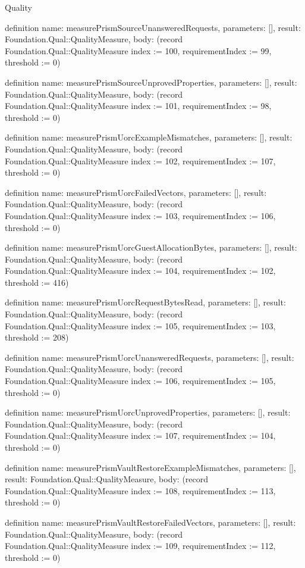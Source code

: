 \begin{lexlean}{Quality}
\begin{semanticmodule}
definition{
  name: measurePrismSourceUnansweredRequests,
  parameters: [],
  result: Foundation.Qual::QualityMeasure,
  body: (record Foundation.Qual::QualityMeasure {index := 100, requirementIndex := 99, threshold := 0})
}

definition{
  name: measurePrismSourceUnprovedProperties,
  parameters: [],
  result: Foundation.Qual::QualityMeasure,
  body: (record Foundation.Qual::QualityMeasure {index := 101, requirementIndex := 98, threshold := 0})
}

definition{
  name: measurePrismUorcExampleMismatches,
  parameters: [],
  result: Foundation.Qual::QualityMeasure,
  body: (record Foundation.Qual::QualityMeasure {index := 102, requirementIndex := 107, threshold := 0})
}

definition{
  name: measurePrismUorcFailedVectors,
  parameters: [],
  result: Foundation.Qual::QualityMeasure,
  body: (record Foundation.Qual::QualityMeasure {index := 103, requirementIndex := 106, threshold := 0})
}

definition{
  name: measurePrismUorcGuestAllocationBytes,
  parameters: [],
  result: Foundation.Qual::QualityMeasure,
  body: (record Foundation.Qual::QualityMeasure {index := 104, requirementIndex := 102, threshold := 416})
}

definition{
  name: measurePrismUorcRequestBytesRead,
  parameters: [],
  result: Foundation.Qual::QualityMeasure,
  body: (record Foundation.Qual::QualityMeasure {index := 105, requirementIndex := 103, threshold := 208})
}

definition{
  name: measurePrismUorcUnansweredRequests,
  parameters: [],
  result: Foundation.Qual::QualityMeasure,
  body: (record Foundation.Qual::QualityMeasure {index := 106, requirementIndex := 105, threshold := 0})
}

definition{
  name: measurePrismUorcUnprovedProperties,
  parameters: [],
  result: Foundation.Qual::QualityMeasure,
  body: (record Foundation.Qual::QualityMeasure {index := 107, requirementIndex := 104, threshold := 0})
}

definition{
  name: measurePrismVaultRestoreExampleMismatches,
  parameters: [],
  result: Foundation.Qual::QualityMeasure,
  body: (record Foundation.Qual::QualityMeasure {index := 108, requirementIndex := 113, threshold := 0})
}

definition{
  name: measurePrismVaultRestoreFailedVectors,
  parameters: [],
  result: Foundation.Qual::QualityMeasure,
  body: (record Foundation.Qual::QualityMeasure {index := 109, requirementIndex := 112, threshold := 0})
}


\end{semanticmodule}
\end{lexlean}
